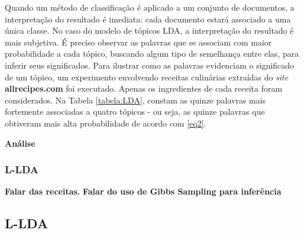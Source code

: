 Quando um método de classificação é aplicado a um conjunto de documentos, a interpretação do resultado é imediata: cada documento estará associado a uma única classe. No caso do modelo de tópicos LDA, a interpretação do resultado é mais subjetiva. É preciso observar as palavras que se associam com maior probabilidade a cada tópico, buscando algum tipo de semelhança entre elas, para inferir seus significados. Para ilustrar como as palavras evidenciam o significado de um tópico, um experimento envolvendo receitas culinárias extraídas do \emph{site} \textbf{allrecipes.com} foi executado. Apenas os ingredientes de cada receita foram considerados. Na Tabela \ref{tabela:LDA}, constam as quinze palavras mais fortemente associadas a quatro tópicos - ou seja, as quinze palavras que obtiveram mais alta probabilidade de acordo com \ref{eq2}.

\textbf{Análise}

\subsubsection{L-LDA}






 \textbf{Falar das receitas.}
\textbf{Falar do uso de Gibbs Sampling para inferência}


\subsection{L-LDA}


